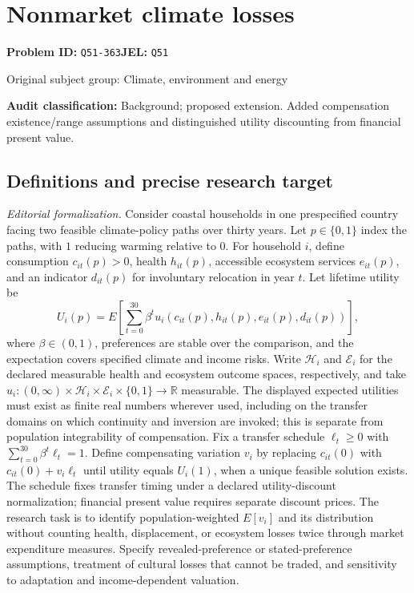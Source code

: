 \documentclass[11pt,a4paper]{article}
\newcommand{\R}{\mathbb R}
\begin{document}
\section*{Nonmarket climate losses}
\textbf{Problem ID:} \texttt{Q51-363}\quad \textbf{JEL:} \texttt{Q51}\par
\label{problem:OP-0432}
{\sffamily\small\color{muted}Original subject group: Climate, environment and energy\par}
\label{definitions:problem:30007714}
\textbf{Audit classification:} Background; proposed extension. Added compensation existence/range assumptions and distinguished utility discounting from financial present value.
\subsection*{Definitions and precise research target}
\textit{Editorial formalization.} Consider coastal households in one prespecified country facing two feasible climate-policy paths over thirty years. Let \(p\in\{0,1\}\) index the paths, with \(1\) reducing warming relative to \(0\). For household \(i\), define consumption \(c_{it}(p)>0\), health \(h_{it}(p)\), accessible ecosystem services \(e_{it}(p)\), and an indicator \(d_{it}(p)\) for involuntary relocation in year \(t\). Let lifetime utility be
\[U_i(p)=E\!\left[\sum_{t=0}^{30}\beta^t u_i(c_{it}(p),h_{it}(p),e_{it}(p),d_{it}(p))\right],\]
where \(\beta\in(0,1)\), preferences are stable over the comparison, and the expectation covers specified climate and income risks. Write \(\mathcal H_i\) and \(\mathcal E_i\) for the declared measurable health and ecosystem outcome spaces, respectively, and take \(u_i:(0,\infty)\times\mathcal H_i\times\mathcal E_i\times\{0,1\}\to\R\) measurable. The displayed expected utilities must exist as finite real numbers wherever used, including on the transfer domains on which continuity and inversion are invoked; this is separate from population integrability of compensation. Fix a transfer schedule \(\ell_t\geq0\) with \(\sum_{t=0}^{30}\beta^t\ell_t=1\). Define compensating variation \(v_i\) by replacing \(c_{it}(0)\) with \(c_{it}(0)+v_i\ell_t\) until utility equals \(U_i(1)\), when a unique feasible solution exists. The schedule fixes transfer timing under a declared utility-discount normalization; financial present value requires separate discount prices. The research task is to identify population-weighted \(E[v_i]\) and its distribution without counting health, displacement, or ecosystem losses twice through market expenditure measures. Specify revealed-preference or stated-preference assumptions, treatment of cultural losses that cannot be traded, and sensitivity to adaptation and income-dependent valuation.
\end{document}

